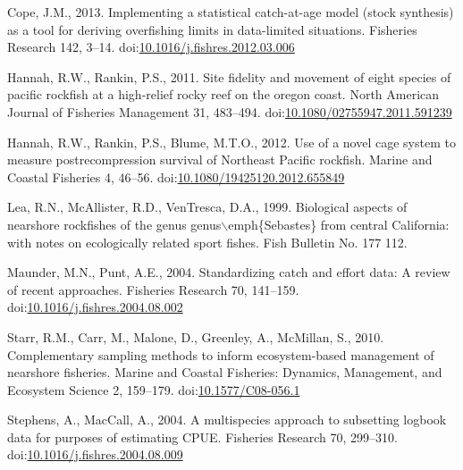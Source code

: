 \documentclass[]{elsarticle} %
\newlength{\cslhangindent}
\newenvironment{CSLReferences}[2] %
 {%
  \setlength{\parindent}{0pt}
  \ifodd #1 \everypar{\setlength{\hangindent}{\cslhangindent}}\ignorespaces\fi
  \ifnum #2 > 0
  \setlength{\parskip}{#2\baselineskip}
  \fi
 }%
 {}
\begin{document}
\begin{CSLReferences}{1}{0}
\leavevmode{}%
Cope, J.M., 2013. {Implementing a statistical catch-at-age model (stock
synthesis) as a tool for deriving overfishing limits in data-limited
situations}. Fisheries Research 142, 3--14.
doi:\href{https://doi.org/10.1016/j.fishres.2012.03.006}{10.1016/j.fishres.2012.03.006}

\leavevmode{}%
Hannah, R.W., Rankin, P.S., 2011. {Site fidelity and movement of eight
species of pacific rockfish at a high-relief rocky reef on the oregon
coast}. North American Journal of Fisheries Management 31, 483--494.
doi:\href{https://doi.org/10.1080/02755947.2011.591239}{10.1080/02755947.2011.591239}

\leavevmode{}%
Hannah, R.W., Rankin, P.S., Blume, M.T.O., 2012. {Use of a novel cage
system to measure postrecompression survival of Northeast Pacific
rockfish}. Marine and Coastal Fisheries 4, 46--56.
doi:\href{https://doi.org/10.1080/19425120.2012.655849}{10.1080/19425120.2012.655849}

\leavevmode{}%
Lea, R.N., McAllister, R.D., VenTresca, D.A., 1999. {Biological aspects
of nearshore rockfishes of the genus
genus\(\backslash\)emph{\{}Sebastes{\}} from central California: with
notes on ecologically related sport fishes}. Fish Bulletin No. 177 112.

\leavevmode{}%
Maunder, M.N., Punt, A.E., 2004. {Standardizing catch and effort data: A
review of recent approaches}. Fisheries Research 70, 141--159.
doi:\href{https://doi.org/10.1016/j.fishres.2004.08.002}{10.1016/j.fishres.2004.08.002}

\leavevmode{}%
Starr, R.M., Carr, M., Malone, D., Greenley, A., McMillan, S., 2010.
{Complementary sampling methods to inform ecosystem-based management of
nearshore fisheries}. Marine and Coastal Fisheries: Dynamics,
Management, and Ecosystem Science 2, 159--179.
doi:\href{https://doi.org/10.1577/C08-056.1}{10.1577/C08-056.1}

\leavevmode{}%
Stephens, A., MacCall, A., 2004. {A multispecies approach to subsetting
logbook data for purposes of estimating CPUE}. Fisheries Research 70,
299--310.
doi:\href{https://doi.org/10.1016/j.fishres.2004.08.009}{10.1016/j.fishres.2004.08.009}

\end{CSLReferences}
\end{document}

